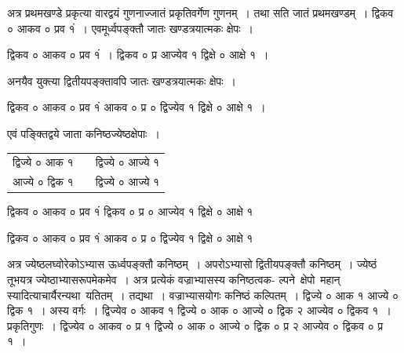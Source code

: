\documentclass[11pt, openany]{book}
\begin{document}
{{ अत्र प्रथमखण्डे प्रकृत्या वारद्वयं गुणनाज्जातं प्रकृतिवर्गेण गुणनम्~।
तथा सति जातं प्रथमखण्डम्~। द्विकव ० आकव ० प्रव १ं~। एवमूर्ध्वपङ्क्तौ जातः
खण्डत्रयात्मकः क्षेपः~। \\
\vspace{-4mm}

\hspace{4mm} द्विकव ० आकव ० प्रव १ं~। द्विकव ० प्र आज्येव १ द्विक्षे ० आक्षे १~। \\
\vspace{-4mm}

अनयैव युक्त्या द्वितीयपङ्क्तावपि जातः खण्डत्रयात्मकः क्षेपः~। \\
\vspace{-4mm}

\hspace{4mm} द्विकव ० आकव ० प्रव १ं आकव ० प्र ० द्विज्येव १ द्विक्षे ० आक्षे १~। \\
\vspace{-4mm}

एवं पङ्क्तिद्वये जाता कनिष्ठज्येष्ठक्षेपाः~। 
\vspace{-2mm}

\begin{table}[h!]
    \centering\s
    \begin{tabular}{rp{0.1cm}r}
        द्विज्ये ० आक १ &&द्विज्ये ० आज्ये १ \\
 आज्ये ० द्विक १ &&द्विज्ये ० आज्ये १ 
    \end{tabular}
\end{table}
\vspace{-2mm}

\hspace{4mm} द्विकव ० आकव ० प्रव १ं द्विकव ० प्र ० आज्येव १ द्विक्षे ० आक्षे १ \\
\vspace{-5mm}

\hspace{4mm} द्विकव ० आकव ० प्रव १ं आकव ० प्र ० द्विज्येव १ द्विक्षे ० आक्षे १ \\
\vspace{-4mm}

 अत्र ज्येष्ठलघ्वोरेकोऽभ्यास ऊर्ध्वपङ्क्तौ कनिष्ठम्~। अपरोऽभ्यासो
द्वितीयपङ्क्तौ कनिष्ठम्~। ज्येष्ठं तूभयत्र ज्येष्ठाभ्यासरूपमेकमेव~। अत्र प्रत्येकं
वज्राभ्यासस्य कनिष्ठत्वक- 
\newpage
\noindent ल्पने \,क्षेपो \,महान् \,स्यादित्याचार्यैरन्यथा \,यतितम्~। तद्यथा~। वज्राभ्यासयोगः कनिष्ठं कल्पितम्~। द्विज्ये ० आक १ आज्ये ० द्विक १~। अस्य वर्गः~। द्विज्येव ० आकव १ द्विज्ये ० आक ० आज्ये ० द्विक २ आज्येव ० द्विकव १~। प्रकृतिगुणः~। द्विज्येव ० आकव ० प्र १ द्विज्ये ० आक ० आज्ये ० द्विक ० प्र २ आज्येव ० द्विकव ० प्र १~। \\

}}
\end{document}
